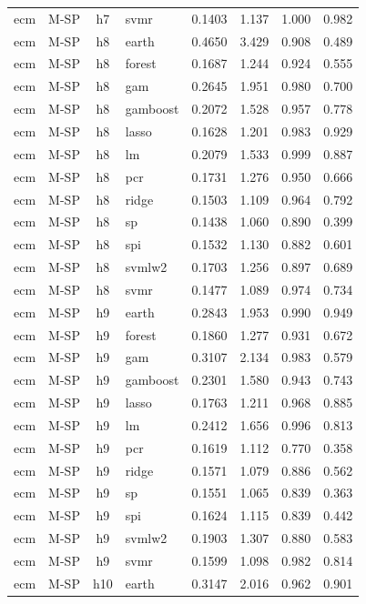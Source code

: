 \begin{ThreePartTable}
\begin{longtable}[t]{llclcccc}
ecm & M-SP & h7 & svmr & 0.1403 & 1.137 & 1.000 & 0.982\\
\addlinespace
ecm & M-SP & h8 & earth & 0.4650 & 3.429 & 0.908 & 0.489\\
ecm & M-SP & h8 & forest & 0.1687 & 1.244 & 0.924 & 0.555\\
ecm & M-SP & h8 & gam & 0.2645 & 1.951 & 0.980 & 0.700\\
ecm & M-SP & h8 & gamboost & 0.2072 & 1.528 & 0.957 & 0.778\\
ecm & M-SP & h8 & lasso & 0.1628 & 1.201 & 0.983 & 0.929\\
ecm & M-SP & h8 & lm & 0.2079 & 1.533 & 0.999 & 0.887\\
ecm & M-SP & h8 & pcr & 0.1731 & 1.276 & 0.950 & 0.666\\
ecm & M-SP & h8 & ridge & 0.1503 & 1.109 & 0.964 & 0.792\\
ecm & M-SP & h8 & sp & 0.1438 & 1.060 & 0.890 & 0.399\\
ecm & M-SP & h8 & spi & 0.1532 & 1.130 & 0.882 & 0.601\\
ecm & M-SP & h8 & svmlw2 & 0.1703 & 1.256 & 0.897 & 0.689\\
ecm & M-SP & h8 & svmr & 0.1477 & 1.089 & 0.974 & 0.734\\
\addlinespace
ecm & M-SP & h9 & earth & 0.2843 & 1.953 & 0.990 & 0.949\\
ecm & M-SP & h9 & forest & 0.1860 & 1.277 & 0.931 & 0.672\\
ecm & M-SP & h9 & gam & 0.3107 & 2.134 & 0.983 & 0.579\\
ecm & M-SP & h9 & gamboost & 0.2301 & 1.580 & 0.943 & 0.743\\
ecm & M-SP & h9 & lasso & 0.1763 & 1.211 & 0.968 & 0.885\\
ecm & M-SP & h9 & lm & 0.2412 & 1.656 & 0.996 & 0.813\\
ecm & M-SP & h9 & pcr & 0.1619 & 1.112 & 0.770 & 0.358\\
ecm & M-SP & h9 & ridge & 0.1571 & 1.079 & 0.886 & 0.562\\
ecm & M-SP & h9 & sp & 0.1551 & 1.065 & 0.839 & 0.363\\
ecm & M-SP & h9 & spi & 0.1624 & 1.115 & 0.839 & 0.442\\
ecm & M-SP & h9 & svmlw2 & 0.1903 & 1.307 & 0.880 & 0.583\\
ecm & M-SP & h9 & svmr & 0.1599 & 1.098 & 0.982 & 0.814\\
\addlinespace
ecm & M-SP & h10 & earth & 0.3147 & 2.016 & 0.962 & 0.901\\

\end{longtable}
\end{ThreePartTable}
